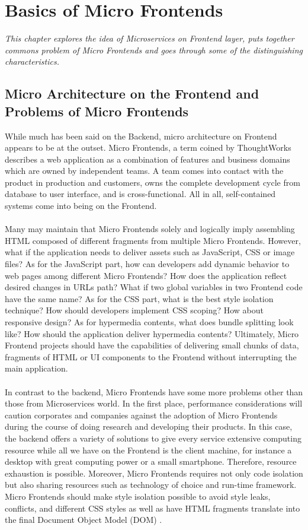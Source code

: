\documentclass[a4paper]{book}
\begin{document}
\chapter{Basics of Micro Frontends}
\textit{This chapter explores the idea of Microservices on Frontend layer, puts together commons problem of Micro Frontends and goes through some of the distinguishing characteristics.}
\section{Micro Architecture on the Frontend and Problems of Micro Frontends}
While much has been said on the Backend, micro architecture on Frontend appears to be at the outset. Micro Frontends, a term coined by ThoughtWorks describes a web application as a combination of features and business domains which are owned by independent teams. A team comes into contact with the product in production and customers, owns the complete development cycle from database to user interface, and is cross-functional. All in all, self-contained systems come into being on the Frontend. \cite{micro-frontends.org}
\\ \\
Many may maintain that Micro Frontends solely and logically imply assembling HTML composed of different fragments from multiple Micro Frontends. However, what if the application needs to deliver assets such as JavaScript, CSS or image files? As for the JavaScript part, how can developers add dynamic behavior to web pages among different Micro Frontends? How does the application reflect desired changes in URLs path? What if two global variables in two Frontend code have the same name? As for the CSS part, what is the best style isolation technique? How should developers implement CSS scoping? How about responsive design? As for hypermedia contents, what does bundle splitting look like? How should the application deliver hypermedia contents? Ultimately, Micro Frontend projects should have the capabilities of delivering small chunks of data, fragments of HTML or UI components to the Frontend without interrupting the main application.
\\ \\
In contrast to the backend, Micro Frontends have some more problems other than those from Microservices world. In the first place, performance considerations will caution corporates and companies against the adoption of Micro Frontends during the course of doing research and developing their products. In this case, the backend offers a variety of solutions to give every service extensive computing resource while all we have on the Frontend is the client machine, for instance a desktop with great computing power or a small smartphone. Therefore, resource exhaustion is possible. Moreover, Micro Frontends requires not only code isolation but also sharing resources such as technology of choice and run-time framework. Micro Frontends should make style isolation possible to avoid style leaks, conflicts, and different CSS styles as well as have HTML fragments translate into the final Document Object Model (DOM) \cite{DOM}.
\end{document}
